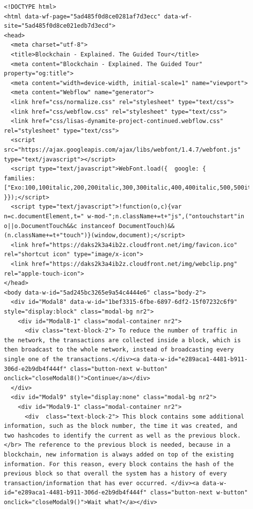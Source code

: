 
\begin{lstlisting}
<!DOCTYPE html>
<html data-wf-page="5ad485f0d8ce0281af7d3ecc" data-wf-site="5ad485f0d8ce021edb7d3ecd">
<head>
  <meta charset="utf-8">
  <title>Blockchain - Explained. The Guided Tour</title>
  <meta content="Blockchain - Explained. The Guided Tour" property="og:title">
  <meta content="width=device-width, initial-scale=1" name="viewport">
  <meta content="Webflow" name="generator">
  <link href="css/normalize.css" rel="stylesheet" type="text/css">
  <link href="css/webflow.css" rel="stylesheet" type="text/css">
  <link href="css/lisas-dynamite-project-continued.webflow.css" rel="stylesheet" type="text/css">
  <script src="https://ajax.googleapis.com/ajax/libs/webfont/1.4.7/webfont.js" type="text/javascript"></script>
  <script type="text/javascript">WebFont.load({  google: {    families: ["Exo:100,100italic,200,200italic,300,300italic,400,400italic,500,500italic,600,600italic,700,700italic,800,800italic,900,900italic","Roboto:100,100italic,300,300italic,regular,italic,500,500italic,700,700italic,900,900italic"]  }});</script>
  <script type="text/javascript">!function(o,c){var n=c.documentElement,t=" w-mod-";n.className+=t+"js",("ontouchstart"in o||o.DocumentTouch&&c instanceof DocumentTouch)&&(n.className+=t+"touch")}(window,document);</script>
  <link href="https://daks2k3a4ib2z.cloudfront.net/img/favicon.ico" rel="shortcut icon" type="image/x-icon">
  <link href="https://daks2k3a4ib2z.cloudfront.net/img/webclip.png" rel="apple-touch-icon">
</head>
<body data-w-id="5ad245bc3265e9a54c4444e6" class="body-2">
  <div id="Modal8" data-w-id="1bef3315-6fbe-6897-6df2-15f07232c6f9" style="display:block" class="modal-bg nr2">
    <div id="Modal8-1" class="modal-container nr2">
      <div class="text-block-2"> To reduce the number of traffic in the network, the transactions are collected inside a block, which is then broadcast to the whole network, instead of broadcasting every single one of the transactions.</div><a data-w-id="e289aca1-4481-b911-306d-e2b9db4f444f" class="button-next w-button" onclick="closeModal8()">Continue</a></div>
  </div>
  <div id="Modal9" style="display:none" class="modal-bg nr2">
    <div id="Modal9-1" class="modal-container nr2">
      <div  class="text-block-2"> This block contains some additional information, such as the block number, the time it was created, and two hashcodes to identify the current as well as the previous block. </br> The reference to the previous block is needed, because in a blockchain, new information is always added on top of the existing information. For this reason, every block contains the hash of the previous block so that overall the system has a history of every transaction/information that has ever occurred. </div><a data-w-id="e289aca1-4481-b911-306d-e2b9db4f444f" class="button-next w-button" onclick="closeModal9()">Wait what?</a></div>

\end{lstlisting}
